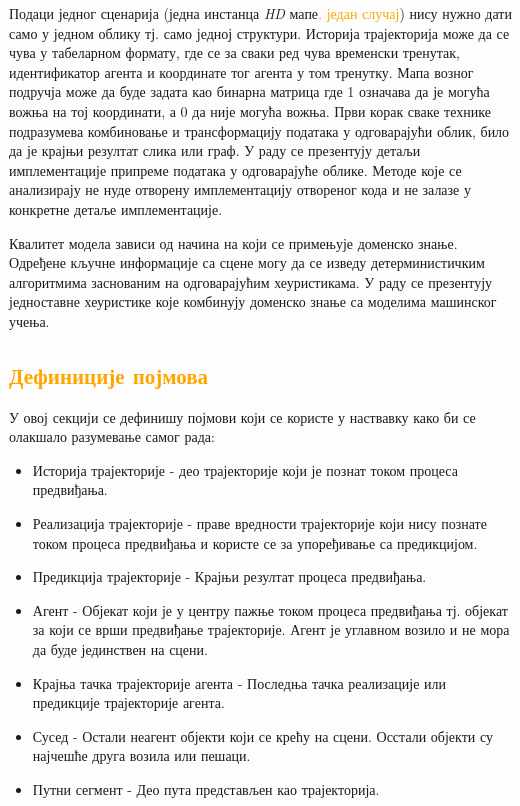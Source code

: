 \documentclass[11pt,oneside]{memoir}
\begin{document}
Подаци једног сценарија (једна инстанца \textit{HD} мапе\textcolor{orange}{, један случај}) нису нужно дати само у једном облику 
тј. само једној структури. Историја
трајекторија може да се чува у табеларном формату, где се за сваки ред чува временски тренутак, идентификатор агента и координате
тог агента у том тренутку. Мапа возног подручја може да буде задата као бинарна матрица где 1 означава да је могућа вожња на тој координати, 
а 0 да није могућа вожња. Први корак
сваке технике подразумева комбиновање и трансформацију података у одговарајући облик, било да је крајњи резултат слика или граф. У раду
се презентују детаљи имплементације припреме података у одговарајуће облике. 
Методе које се анализирају не нуде отворену имплементацију отвореног кода и не залазе у конкретне детаље имплементације. 

Квалитет модела зависи од начина на који се примењује доменско знање. Одређене кључне информације
са сцене могу да се изведу детерминистичким алгоритмима заснованим на одговарајућим хеуристикама. У раду се презентују
једноставне хеуристике које комбинују доменско знање са моделима машинског учења.

\textcolor{orange}{\section{Дефиниције појмова}}

У овој секцији се дефинишу појмови који се користе у наствавку како би се олакшало разумевање самог рада:
\begin{itemize}
  \item Историја трајекторије - део трајекторије који је познат током процеса предвиђања.
  \item Реализација трајекторије - праве вредности трајекторије који нису познате током процеса предвиђања и користе се за упоређивање са предикцијом.
  \item Предикција трајекторије - Крајњи резултат процеса предвиђања.
  \item Агент - Објекат који је у центру пажње током процеса предвиђања тј. објекат за који се врши предвиђање трајекторије. 
        Агент је углавном возило и не мора да буде јединствен на сцени.
  \item Крајња тачка трајекторије агента - Последња тачка реализације или предикције трајекторије агента.
  \item Сусед - Остали неагент објекти који се крећу на сцени. Осстали објекти су најчешће друга возила или пешаци.
  \item Путни сегмент - Део пута представљен као трајекторија.
\end{itemize}
\end{document}
